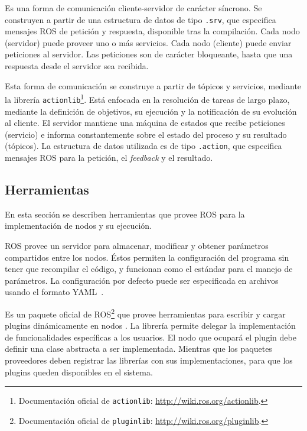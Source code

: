  Es una forma de comunicación cliente-servidor de carácter síncrono. Se construyen a partir de una estructura de datos de tipo \texttt{.srv}, que especifica mensajes ROS de petición y respuesta, disponible tras la compilación. Cada nodo (servidor) puede proveer uno o más servicios. Cada nodo (cliente) puede enviar peticiones al servidor. Las peticiones son de carácter bloqueante, hasta que una respuesta desde el servidor sea recibida.

 Esta forma de comunicación se construye a partir de tópicos y servicios, mediante la librería \texttt{actionlib}\footnote{Documentación oficial de \texttt{actionlib}: \url{http://wiki.ros.org/actionlib}.}. Está enfocada en la resolución de tareas de largo plazo, mediante la definición de objetivos, su ejecución y la notificación de su evolución al cliente. El servidor mantiene una máquina de estados que recibe peticiones (servicio) e informa constantemente sobre el estado del proceso y su resultado (tópicos). La estructura de datos utilizada es de tipo \texttt{.action}, que especifica mensajes ROS para la petición, el \textit{feedback} y el resultado.


\subsection{Herramientas}

En esta sección se describen herramientas que provee ROS para la implementación de nodos y su ejecución.

 ROS provee un servidor para almacenar, modificar y obtener parámetros compartidos entre los nodos. Éstos permiten la configuración del programa sin tener que recompilar el código, y funcionan como el estándar para el manejo de parámetros. La configuración por defecto puede ser especificada en archivos usando el formato YAML~\cite{yaml}.

 Es un paquete oficial de ROS\footnote{Documentación oficial de \texttt{pluginlib}: \url{http://wiki.ros.org/pluginlib}.} que provee herramientas para escribir y cargar plugins dinámicamente en nodos \CC. La librería permite delegar la implementación de funcionalidades específicas a los usuarios. El nodo que ocupará el plugin debe definir una clase abstracta a ser implementada. Mientras que los paquetes proveedores deben registrar las librerías con sus implementaciones, para que los plugins queden disponibles en el sistema.


